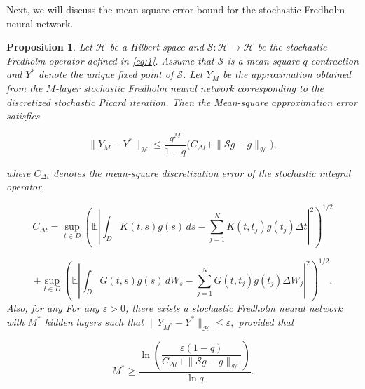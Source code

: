 \documentclass[preprint,12pt,authoryear]{elsarticle}
\newtheorem{proposition}{Proposition}
\begin{document}
Next, we will discuss the mean-square error bound for the stochastic Fredholm neural network.
\begin{proposition}
\label{prop:error}
Let $\mathcal H$ be a Hilbert space and  
$\mathcal S:\mathcal H\to\mathcal H$ be the stochastic Fredholm operator defined in \eqref{eq:1}. 
Assume that $\mathcal S$ is a mean-square $q$-contraction and $Y^\ast$ denote the unique fixed point of $\mathcal S$. Let $Y_M$ be the approximation obtained from the $M$-layer stochastic 
Fredholm neural network corresponding to the discretized stochastic 
Picard iteration. Then the Mean-square approximation error satisfies

\begin{equation}
	\|Y_M-Y^\ast\|_{\mathcal H}
	\le
	\frac{q^M}{1-q}
	\Big(
	C_{\Delta t}
	+
	\|\mathcal S g-g\|_{\mathcal H}
	\Big),
	\label{eq:2.21}
\end{equation}

where $C_{\Delta t}$ denotes the mean-square discretization error of the stochastic integral operator,

\[
C_{\Delta t}
=
\sup_{t\in D}
\left(
\mathbb E
\left|
\int_D K(t,s)g(s)\,ds
-
\sum_{j=1}^{N}K(t,t_j)g(t_j)\Delta t
\right|^2
\right)^{1/2}
\]

\[
+
\sup_{t\in D}
\left(
\mathbb E
\left|
\int_D G(t,s)g(s)\,dW_s
-
\sum_{j=1}^{N}G(t,t_j)g(t_j)\Delta W_j
\right|^2
\right)^{1/2}.
\]
Also, for any For any $\varepsilon>0$, there exists a stochastic Fredholm neural network 
with $M^\ast$ hidden layers such that $
\|Y_{M^\ast}-Y^\ast\|_{\mathcal H}\le\varepsilon,
$ provided that

\begin{equation}
	M^\ast
	\ge
	\frac{
		\ln\!\left(
		\dfrac{\varepsilon(1-q)}
		{C_{\Delta t}+\|\mathcal S g-g\|_{\mathcal H}}
		\right)
	}{\ln q}.
	\label{eq:2.23}
\end{equation}
\end{proposition}
\end{document}
